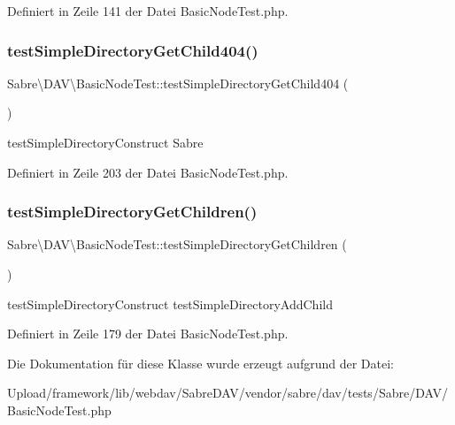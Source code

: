 Definiert in Zeile 141 der Datei Basic\+Node\+Test.\+php.

\mbox{\label{class_sabre_1_1_d_a_v_1_1_basic_node_test_a2a5b3336620a4d2015526baac5f9a36e}} 
\subsubsection{\texorpdfstring{test\+Simple\+Directory\+Get\+Child404()}{testSimpleDirectoryGetChild404()}}
{\footnotesize\ttfamily Sabre\textbackslash{}\+D\+A\+V\textbackslash{}\+Basic\+Node\+Test\+::test\+Simple\+Directory\+Get\+Child404 (\begin{DoxyParamCaption}{ }\end{DoxyParamCaption})}

test\+Simple\+Directory\+Construct  Sabre 

Definiert in Zeile 203 der Datei Basic\+Node\+Test.\+php.

\mbox{\label{class_sabre_1_1_d_a_v_1_1_basic_node_test_a59a7ed3c8cbc7869e56f3c9d2e74cdaf}} 
\subsubsection{\texorpdfstring{test\+Simple\+Directory\+Get\+Children()}{testSimpleDirectoryGetChildren()}}
{\footnotesize\ttfamily Sabre\textbackslash{}\+D\+A\+V\textbackslash{}\+Basic\+Node\+Test\+::test\+Simple\+Directory\+Get\+Children (\begin{DoxyParamCaption}{ }\end{DoxyParamCaption})}

test\+Simple\+Directory\+Construct  test\+Simple\+Directory\+Add\+Child 

Definiert in Zeile 179 der Datei Basic\+Node\+Test.\+php.



Die Dokumentation für diese Klasse wurde erzeugt aufgrund der Datei\+:\begin{DoxyCompactItemize}
\item 
Upload/framework/lib/webdav/\+Sabre\+D\+A\+V/vendor/sabre/dav/tests/\+Sabre/\+D\+A\+V/Basic\+Node\+Test.\+php\end{DoxyCompactItemize}
